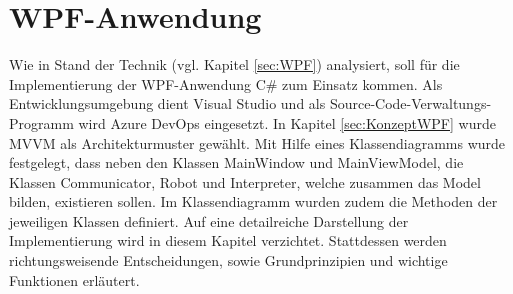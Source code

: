 \documentclass[ a4paper,
                oneside,
                toc=bibliography,
                toc=listof
                ]{scrbook}
\begin{document}
	\section{WPF-Anwendung}
	Wie in Stand der Technik (vgl. Kapitel \ref{sec:WPF}) analysiert, soll für die Implementierung der WPF-Anwendung C\# zum Einsatz kommen. Als Entwicklungsumgebung dient Visual Studio und als Source-Code-Verwaltungs-Programm wird \glqq Azure DevOps\grqq{} eingesetzt. In Kapitel \ref{sec:KonzeptWPF} wurde MVVM als Architekturmuster gewählt. Mit Hilfe eines Klassendiagramms wurde festgelegt, dass neben den Klassen MainWindow und MainViewModel, die Klassen Communicator, Robot und Interpreter, welche zusammen das Model bilden, existieren sollen. Im Klassendiagramm wurden zudem die Methoden der jeweiligen Klassen definiert. Auf eine detailreiche Darstellung der Implementierung wird in diesem Kapitel verzichtet. Stattdessen werden richtungsweisende Entscheidungen, sowie Grundprinzipien und wichtige Funktionen erläutert.
\end{document}
